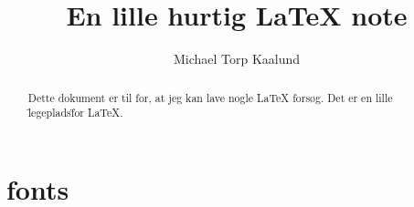 \documentclass[10pt,a4paper]{report}
\title{En lille hurtig \LaTeX{} note}
\author{Michael Torp Kaalund}
\begin{document}
    
    \begin{titlepage}
        \maketitle
    \end{titlepage}

    \begin{abstract}
Dette dokument er til for, at jeg kan lave nogle \LaTeX{} forsøg. Det er en lille \"legeplads\" for \LaTeX{}.
    \end{abstract}

    \tableofcontents

    \chapter{fonts}
    
    
    
    
    
    
    
    
    
    
    
    
    
    
    
    
    
    
    
    
    


    
\end{document}
